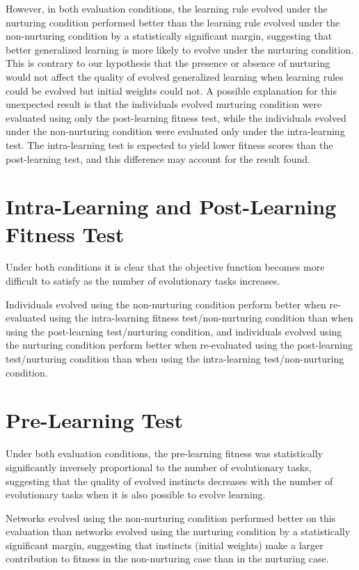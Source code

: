 \documentclass[master]{outhesis}
\begin{document}
However, in both evaluation conditions,
the learning rule evolved under the nurturing condition performed better than the learning rule evolved under the non-nurturing condition by a statistically significant margin,
suggesting that better generalized learning is more likely to evolve under the nurturing condition.
This is contrary to our hypothesis that the presence or absence of nurturing would not affect the quality of evolved generalized learning 
when learning rules could be evolved but initial weights could not.
A possible explanation for this unexpected result is that the individuals evolved nurturing condition were evaluated using only the post-learning fitness test,
while the individuals evolved under the non-nurturing condition were evaluated only under the intra-learning test.
The intra-learning test is expected to yield lower fitness scores than the post-learning test,
and this difference may account for the result found.

\section{Intra-Learning and Post-Learning Fitness Test}

Under both conditions it is clear that the objective function becomes more difficult to satisfy as the number of evolutionary tasks increases. 

Individuals evolved using the non-nurturing condition perform better when re-evaluated using the intra-learning fitness test/non-nurturing condition than when using the post-learning test/nurturing condition,
and individuals evolved using the nurturing condition perform better when re-evaluated using the post-learning test/nurturing condition than when using the intra-learning test/non-nurturing condition.

\section{Pre-Learning Test}

Under both evaluation conditions, the pre-learning fitness was statistically significantly inversely proportional to the number of evolutionary tasks,
suggesting that the quality of evolved instincts decreases with the number of evolutionary tasks when it is also possible to evolve learning.

Networks evolved using the non-nurturing condition performed better on this evaluation than networks evolved using the nurturing condition by a statistically significant margin,
suggesting that instincts (initial weights) make a larger contribution to fitness in the non-nurturing case than in the nurturing case.
\end{document}

